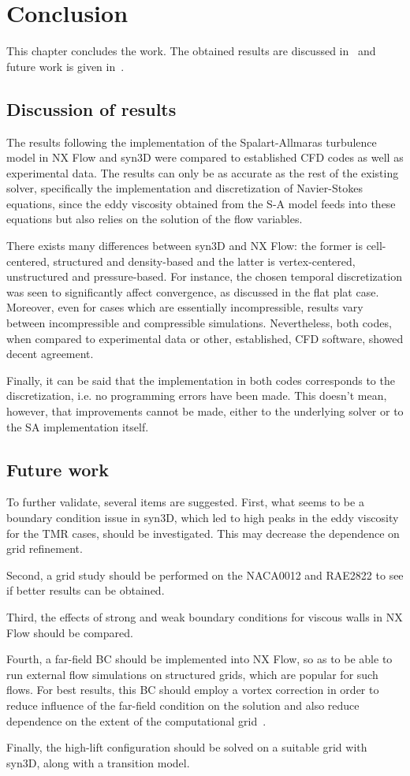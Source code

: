 \chapter{Conclusion}
This chapter concludes the work. The obtained results are discussed in~ and future work is given in~.

\section{Discussion of results}
\label{sec:conclusionresults}
The results following the implementation of the Spalart-Allmaras turbulence model in NX Flow and syn3D were compared to established CFD codes as well as experimental data. The results can only be as accurate as the rest of the existing solver, specifically the implementation and discretization of Navier-Stokes equations, since the eddy viscosity obtained from the S-A model feeds into these equations but also relies on the solution of the flow variables.

There exists many differences between syn3D and NX Flow: the former is cell-centered, structured and density-based and the latter is vertex-centered, unstructured and pressure-based. For instance, the chosen temporal discretization was seen to significantly affect convergence, as discussed in the flat plat case. Moreover, even for cases which are essentially incompressible, results vary between incompressible and compressible simulations.
Nevertheless, both codes, when compared to experimental data or other, established, CFD software, showed decent agreement. 

Finally, it can be said that the implementation in both codes corresponds to the discretization, i.e. no programming errors have been made. This doesn't mean, however, that improvements cannot be made, either to the underlying solver or to the SA implementation itself. 

\section{Future work}
\label{sec:future}
To further validate, several items are suggested. 
First, what seems to be a boundary condition issue in syn3D, which led to high peaks in the eddy viscosity for the TMR cases, should be investigated. This may decrease the dependence on grid refinement. 

Second, a grid study should be performed on the NACA0012 and RAE2822 to see if better results can be obtained. 

Third, the effects of strong and weak boundary conditions for viscous walls in NX Flow should be compared. 

Fourth, a far-field BC should be implemented into NX Flow, so as to be able to run external flow simulations on structured grids, which are popular for such flows. For best results, this BC should employ a vortex correction in order to reduce influence of the far-field condition on the solution and also reduce dependence on the extent of the computational grid~\cite{tmrvortex,thomas1986far}.

Finally, the high-lift configuration should be solved on a suitable grid with syn3D, along with a transition model.
